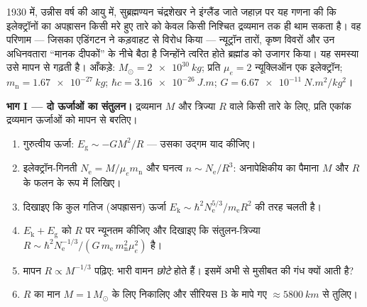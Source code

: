 \begin{problem}\label{pb:b3:quantum-statistics:1}
1930 में, उन्नीस वर्ष की आयु में, सुब्रह्मण्यन चंद्रशेखर ने
इंग्लैंड जाते जहाज़ पर यह गणना की कि इलेक्ट्रॉनों का अपह्रासन किसी
मरे हुए तारे को केवल किसी निश्चित द्रव्यमान तक ही थाम सकता है। वह
परिणाम --- जिसका एडिंगटन ने कड़वाहट से विरोध किया --- न्यूट्रॉन
तारों, कृष्ण विवरों और उन अधिनवतारा ``मानक दीपकों'' के नीचे बैठा है
जिन्होंने त्वरित होते ब्रह्मांड को उजागर किया। यह समस्या उसे मापन से
गढ़ती है। आँकड़े: $M_\odot =
\qty{2e30}{kg}$; प्रति $\mu_e = 2$ न्यूक्लिऑन एक इलेक्ट्रॉन; $m_{\text{
n}} = \qty{1.67e-27}{kg}$; $\hbar c = \qty{3.16e-26}{J.m}$; $G =
\qty{6.67e-11}{N.m^2/kg^2}$।

\medskip\noindent\textbf{भाग I --- दो ऊर्जाओं का संतुलन।}
द्रव्यमान $M$ और त्रिज्या $R$ वाले किसी तारे के लिए, प्रति एकांक
द्रव्यमान ऊर्जाओं को मापन से बरतिए।
\begin{enumerate}
  \item गुरुत्वीय ऊर्जा: $E_{\text{g}} \sim -GM^2/R$ ---
        उसका उद्गम याद कीजिए।
  \item इलेक्ट्रॉन-गिनती $N_{\text{e}} = M/\mu_e m_{\text{n}}$ और
        घनत्व $n \sim N_{\text{e}}/R^3$: अनापेक्षिकीय 
        का पैमाना $M$
        और $R$ के फलन के रूप में लिखिए।
  \item दिखाइए कि कुल गतिज (अपह्रासन) ऊर्जा
        $E_{\text{k}} \sim \hbar^2N_{\text{e}}^{5/3}/m_{\text{e}}
        R^2$ की तरह चलती है।
  \item $E_{\text{k}} + E_{\text{g}}$ को $R$ पर न्यूनतम कीजिए और
        दिखाइए कि संतुलन-त्रिज्या
        $R \sim \hbar^2 N_{\text{e}}^{-1/3}/(G\,m_{\text{e}}\,
        m_{\text{n}}^2\mu_e^2)$ है।
  \item मापन $R \propto M^{-1/3}$ पढ़िए: भारी वामन \emph{छोटे}
        होते हैं। इसमें अभी से मुसीबत की गंध क्यों आती है?
  \item $R$ का मान $M = 1\,M_\odot$ के लिए निकालिए और सीरियस B के
        मापे गए $\approx\qty{5800}{km}$ से तुलिए।
\end{enumerate}


\end{problem}
